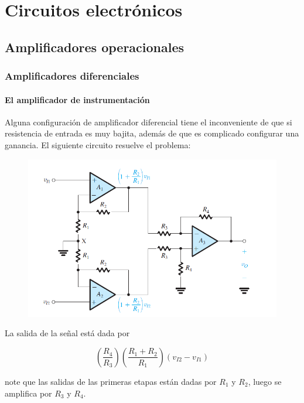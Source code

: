 \chapter{Circuitos electrónicos}

\section{Amplificadores operacionales}

\subsection{Amplificadores diferenciales}

\subsubsection*{El amplificador de instrumentación}

Alguna configuración de amplificador diferencial tiene el inconveniente de que si resistencia de entrada es muy bajita, además de que es complicado configurar una ganancia. El siguiente circuito resuelve el problema:

\begin{figure}[H]
    \centering
    \includegraphics[scale=0.6]{Electronica/electronic_f1.png}
\end{figure}

La salida de la señal está dada por 

\begin{equation*}
\left( \frac{R_4}{R_3} \right) \left( \frac{R_1 + R_2}{R_1} \right) \left( v_{I2} - v_{I1} \right)
\end{equation*}

note que las salidas de las primeras etapas están dadas por $R_1$ y $R_2$, luego se amplifica por $R_3$ y $R_4$. 

